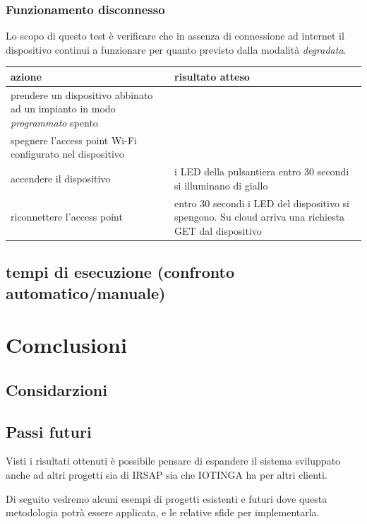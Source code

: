 \documentclass[12pt,a4paper,twoside,titlepage]{book}
\begin{document}
\subsection{Funzionamento disconnesso}

Lo scopo di questo test è verificare che in assenza di connessione ad internet il
dispositivo continui a funzionare per quanto previsto dalla modalità \textit{degradata}.

\begin{center}
\begin{tabular}{| p{5cm} | p{5cm} |}
    \hline \textbf{azione} & \textbf{risultato atteso} \\
    \hline prendere un dispositivo abbinato ad un impianto in modo \textit{programmato} spento & \\
    \hline spegnere l'access point Wi-Fi configurato nel dispositivo & \\
    \hline accendere il dispositivo & i LED della pulsantiera entro 30 secondi si illuminano di giallo \\
    \hline riconnettere l'access point & entro 30 secondi i LED del dispositivo si spengono. Su cloud arriva una richiesta GET dal dispositivo \\
    \hline
\end{tabular}
\end{center}

\section{tempi di esecuzione (confronto automatico/manuale)}

\chapter{Comclusioni}

\section{Considarzioni}

\section{Passi futuri}

Visti i risultati ottenuti è possibile pensare di espandere il sistema sviluppato
anche ad altri progetti sia di IRSAP sia che IOTINGA ha per altri clienti.

Di seguito vedremo alcuni esempi di progetti esistenti e futuri dove questa metodologia
potrà essere applicata, e le relative sfide per implementarla.
\end{document}
